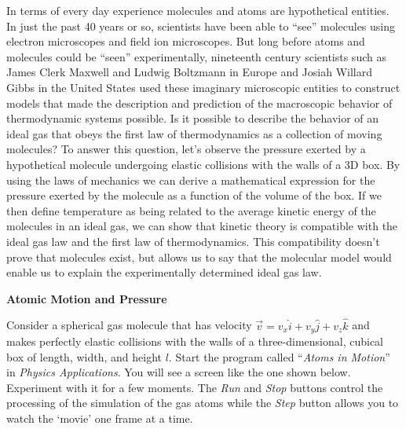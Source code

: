In terms of every day experience molecules and atoms are hypothetical
entities. In just the past 40 years or so, scientists have been able
to ``see'' molecules using electron microscopes and
field ion microscopes. But long before atoms and molecules could be
``seen'' experimentally, nineteenth century scientists
such as James Clerk Maxwell and Ludwig Boltzmann in Europe and Josiah
Willard Gibbs in the United States used these imaginary microscopic
entities to construct models that made the description and prediction
of the macroscopic behavior of thermodynamic systems possible. Is
it possible to describe the behavior of an ideal gas that obeys the
first law of thermodynamics as a collection of moving molecules? To
answer this question, let's observe the pressure exerted by a hypothetical
molecule undergoing elastic collisions with the walls of a 3D box.
By using the laws of mechanics we can derive a mathematical expression
for the pressure exerted by the molecule as a function of the volume
of the box. If we then define temperature as being related to the
average kinetic energy of the molecules in an ideal gas, we can show
that kinetic theory is compatible with the ideal gas law and the first
law of thermodynamics. This compatibility doesn't prove that molecules
exist, but allows us to say that the molecular model would enable
us to explain the experimentally determined ideal gas law.

\textbf{Atomic Motion and Pressure}

Consider a spherical gas molecule that has velocity 
$\overrightarrow{v}=v_{x} \hat{i}+v_{y}  \hat{j} + v_z\hat k$ and
makes perfectly elastic collisions with the walls of a three-dimensional, cubical
box of length, width, and height $l$.  Start the program called ``\textit{Atoms
in Motion}'' in \textit{Physics Applications}.  
You will see a screen
like the one shown below. Experiment with it for a few moments. 
The \textit{Run} and \textit{Stop} buttons control the processing of the 
simulation of the gas atoms while the \textit{Step} button allows you to watch the
`movie' one frame at a time.

